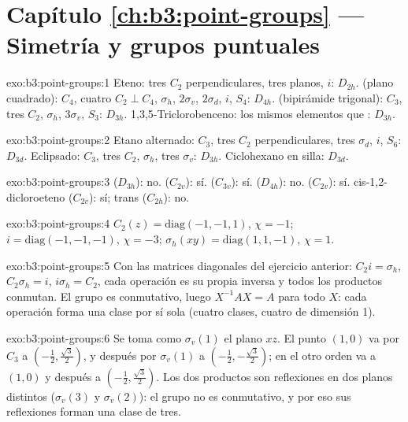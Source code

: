 \section*{Capítulo \ref{ch:b3:point-groups} --- Simetría y grupos puntuales}

\begin{solution}{exo:b3:point-groups:1}
Eteno: tres $C_2$ perpendiculares, tres planos, $i$: $D_{2h}$.  (plano
cuadrado): $C_4$, cuatro $C_2 \perp C_4$, $\sigma_h$, $2\sigma_v$, $2\sigma_d$, $i$, $S_4$:
$D_{4h}$.  (bipirámide trigonal): $C_3$, tres $C_2$, $\sigma_h$, $3\sigma_v$,
$S_3$: $D_{3h}$. 1,3,5-Triclorobenceno: los mismos elementos que : $D_{3h}$.
\end{solution}

\begin{solution}{exo:b3:point-groups:2}
Etano alternado: $C_3$, tres $C_2$ perpendiculares, tres $\sigma_d$, $i$, $S_6$:
$D_{3d}$. Eclipsado: $C_3$, tres $C_2$, $\sigma_h$, tres $\sigma_v$: $D_{3h}$.
Ciclohexano en silla: $D_{3d}$.
\end{solution}

\begin{solution}{exo:b3:point-groups:3}
 ($D_{3h}$): no.  ($C_{2v}$): sí.  ($C_{3v}$): sí.
 ($D_{4h}$): no.  ($C_{2v}$): sí. cis-1,2-dicloroeteno
($C_{2v}$): sí; trans ($C_{2h}$): no.
\end{solution}

\begin{solution}{exo:b3:point-groups:4}
$C_2(z) = \mathrm{diag}(-1,-1,1)$, $\chi = -1$; $i = \mathrm{diag}(-1,-1,-1)$,
$\chi = -3$; $\sigma_h(xy) = \mathrm{diag}(1,1,-1)$, $\chi = 1$.
\end{solution}

\begin{solution}{exo:b3:point-groups:5}
Con las matrices diagonales del ejercicio anterior: $C_2i = \sigma_h$, $C_2\sigma_h =
i$, $i\sigma_h = C_2$, cada operación es su propia inversa y todos los productos
conmutan. El grupo es conmutativo, luego $X^{-1}AX = A$ para todo $X$: cada
operación forma una clase por sí sola (cuatro clases, cuatro 
de dimensión 1).
\end{solution}

\begin{solution}{exo:b3:point-groups:6}
Se toma como $\sigma_v(1)$ el plano $xz$. El punto $(1,0)$ va por $C_3$ a $(-\frac12,
\frac{\sqrt3}2)$, y después por $\sigma_v(1)$ a $(-\frac12,-\frac{\sqrt3}2)$; en el otro
orden va a $(1,0)$ y después a $(-\frac12,\frac{\sqrt3}2)$. Los dos productos son
reflexiones en dos planos distintos ($\sigma_v(3)$ y $\sigma_v(2)$): el grupo no es
conmutativo, y por eso sus reflexiones forman una clase de tres.
\end{solution}

